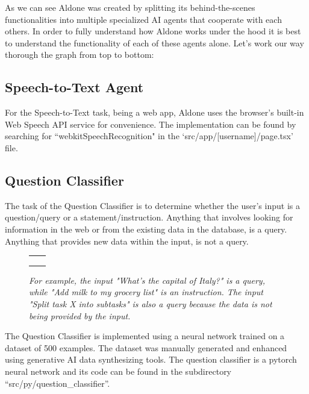 \documentclass{article}
\begin{document}
As we can see Aldone was created by splitting its behind-the-scenes functionalities into multiple specialized AI agents that cooperate with each others. In order to fully understand how Aldone works under the hood it is best to understand the functionality of each of these agents alone. Let's work our way thorough the graph from top to bottom:

\subsection*{\color{draculayellow}Speech-to-Text Agent}
For the Speech-to-Text task, being a web app, Aldone uses the browser's built-in Web Speech API service for convenience. The implementation can be found by searching for ``webkitSpeechRecognition" in the `src/app/[username]/page.tsx' file.

\newpage

\subsection*{\color{draculayellow}Question Classifier}
The task of the Question Classifier is to determine whether the user's input is a question/query or a statement/instruction. Anything that involves looking for information in the web or from the existing data in the database, is a query. Anything that provides new data within the input, is not a query.

\begin{figure}[H]
\begin{center}
\begin{tabular}{SS}
  \toprule
     &  \\
    \midrule
      &  \\
      &   \\
     &   \\
    \bottomrule
\end{tabular}
\end{center}
\caption{\it For example, the input "What's the capital of Italy?" is a query, while "Add milk to my grocery list" is an instruction. The input "Split task X into subtasks" is also a query because the data is not being provided by the input.} \label{faketable:mul}
\end{figure}


The Question Classifier is implemented using a neural network trained on a dataset of 500 examples. The dataset was manually generated and enhanced using generative AI data synthesizing tools. The question classifier is a pytorch neural network and its code can be found in the subdirectory ``src/py/question\_classifier''.
\end{document}
